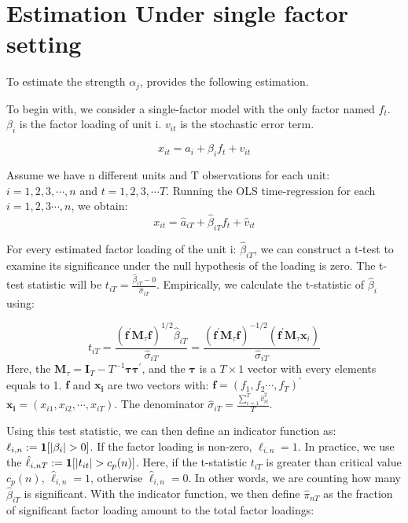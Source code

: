 	\section{Estimation Under single factor setting}\label{strength_one_factor_estimation}
To estimate the strength $\alpha_j$,  provides the following estimation.

To begin with, we consider a single-factor model with the only factor named $f_t$. 
 $\beta_{i}$ is the factor loading of unit i.
$v_{it}$ is the stochastic error term.

\[  x_{it} = a_{i} +  \beta_{i}f_{t} + v_{it} \tag{2} \label{estimation_model}\]

Assume we have n different units and T observations for each unit: $i = 1, 2, 3, \cdots, n$ and $t = 1,2,3, \cdots T$.
Running the OLS time-regression for each $i = 1,2,3\cdots, n$, we obtain:
\[   x_{it} = \hat{a}_{iT} +  \hat{\beta}_{iT}f_{t} + \hat{v}_{it}  \]

For every estimated factor loading of the unit i:  $\hat{\beta}_{iT}$, we can construct a t-test to examine its significance under the null hypothesis of the loading is zero.
The t-test statistic will be $t_{iT} = \frac{\hat{\beta}_{iT} - 0}{\hat{\sigma}_{iT}}$.  
Empirically, we calculate the t-statistic of $\hat{\beta}_i$ using:

\[t_{i T}=\frac{\left(\bm{f}^{\prime} \bm{M}_{\tau} \bm{f}\right)^{1 / 2} \hat{\beta}_{i T}}{\hat{\sigma}_{i T}}=\frac{\left(\bm{f}^{\prime} \bm{M}_{\tau} \bm{f}\right)^{-1 / 2}\left(\bm{f}^{\prime} \bm{M}_{\tau} \bm{x}_{i}\right)}{\hat{\sigma}_{i T}} \tag{3} \label{test_statistic} \]
Here, the $\bm{M}_{\tau} = \bm{I}_T - T^{-1}\bm{\tau}\bm{\tau^\prime}$, and the $\bm{\tau}$ is a $T\times 1$ vector with every elements equals to 1.
$\bm{f}$ and $\bm{x_i}$ are two vectors with: $\bm{f} = (f_1, f_2 \cdots, f_T)^{\prime}$   $\bm{x_i} = (x_{i1}, x_{i2}, \cdots, x_{iT})$.
The denominator $\hat{\sigma}_{iT} = \frac{\sum_{i=1}^{T} \hat{v}^2_{it} }{T}$.

Using this test statistic, we can then define an indicator function as: $\ell_{i,n} := {\bf1}[|\beta_i|>0]$.
If the factor loading is non-zero, $\ell_{i,n} = 1$.
In practice, we use the $\hat{\ell}_{i,nT} := {\bf1}[|t_{it}|>c_p(n)]$.
Here, if the t-statistic $t_{iT}$ is greater than critical value $c_p(n)$,  $\hat{\ell}_{i,n} = 1$, otherwise $\hat{\ell}_{i,n} = 0$.
In other words, we are counting how many $\hat{\beta}_{iT}$ is significant.
With the indicator function, we then define $\hat{\pi}_{nT}$ as the fraction of significant factor loading amount to the total factor loadings:

